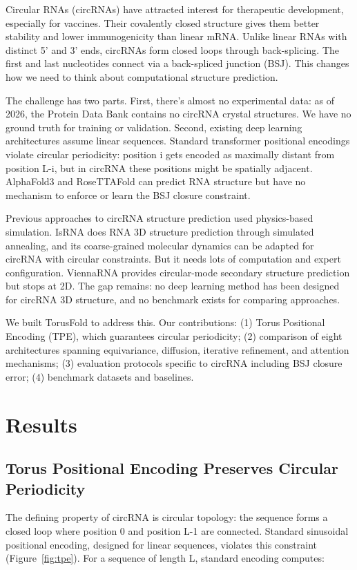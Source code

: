 \documentclass[12pt]{article}
\begin{document}
Circular RNAs (circRNAs) have attracted interest for therapeutic development, especially for vaccines. Their covalently closed structure gives them better stability and lower immunogenicity than linear mRNA. Unlike linear RNAs with distinct 5' and 3' ends, circRNAs form closed loops through back-splicing. The first and last nucleotides connect via a back-spliced junction (BSJ). This changes how we need to think about computational structure prediction.

The challenge has two parts. First, there's almost no experimental data: as of 2026, the Protein Data Bank contains no circRNA crystal structures. We have no ground truth for training or validation. Second, existing deep learning architectures assume linear sequences. Standard transformer positional encodings violate circular periodicity: position i gets encoded as maximally distant from position L-i, but in circRNA these positions might be spatially adjacent. AlphaFold3 and RoseTTAFold can predict RNA structure but have no mechanism to enforce or learn the BSJ closure constraint.

Previous approaches to circRNA structure prediction used physics-based simulation. IsRNA does RNA 3D structure prediction through simulated annealing, and its coarse-grained molecular dynamics can be adapted for circRNA with circular constraints. But it needs lots of computation and expert configuration. ViennaRNA provides circular-mode secondary structure prediction but stops at 2D. The gap remains: no deep learning method has been designed for circRNA 3D structure, and no benchmark exists for comparing approaches.

We built TorusFold to address this. Our contributions: (1) Torus Positional Encoding (TPE), which guarantees circular periodicity; (2) comparison of eight architectures spanning equivariance, diffusion, iterative refinement, and attention mechanisms; (3) evaluation protocols specific to circRNA including BSJ closure error; (4) benchmark datasets and baselines.

\section{Results}

\subsection{Torus Positional Encoding Preserves Circular Periodicity}

The defining property of circRNA is circular topology: the sequence forms a closed loop where position 0 and position L-1 are connected. Standard sinusoidal positional encoding, designed for linear sequences, violates this constraint (Figure~\ref{fig:tpe}). For a sequence of length L, standard encoding computes:
\end{document}
